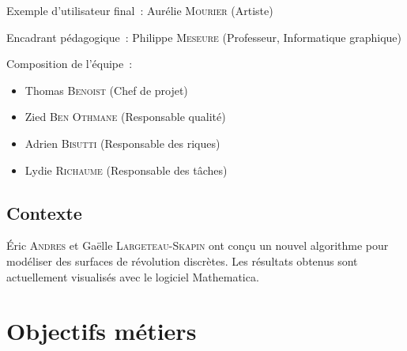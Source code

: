 \documentclass{scrartcl}
\begin{document}
		\noindent
		Exemple d'utilisateur final~: Aurélie \textsc{Mourier} (Artiste)
		\medskip %
		
		\noindent
		Encadrant pédagogique~: Philippe \textsc{Meseure} (Professeur, Informatique graphique)
		\medskip %
		
		\noindent
		Composition de l'équipe~:
			\begin{itemize}
				\item Thomas \textsc{Benoist} (Chef de projet)
				\item Zied \textsc{Ben Othmane} (Responsable qualité)
				\item Adrien \textsc{Bisutti} (Responsable des riques)
				\item Lydie \textsc{Richaume} (Responsable des tâches)
			\end{itemize}
		\medskip %
	

	\subsection{Contexte}
		Éric \textsc{Andres} et Gaëlle \textsc{Largeteau-Skapin} ont conçu un nouvel algorithme pour modéliser des surfaces de révolution discrètes. Les résultats obtenus sont actuellement visualisés avec le logiciel Mathematica.




\section{Objectifs métiers}


\end{document}
